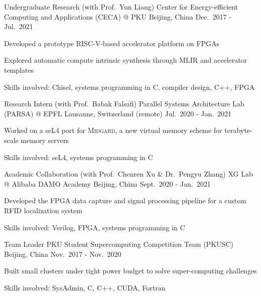 \begin{cventries}
  \cventry
    {Undergraduate Research (with Prof.\ Yun Liang)} %
    {Center for Energy-efficient Computing and Applications (CECA) @ PKU} %
    {Beijing, China} %
    {Dec.\ 2017 - Jul.\ 2021} %
    {
        \begin{cvitems}
            \item {Developed a prototype RISC-V-based accelerator platform on
                FPGAs}
            \item {Explored automatic compute intrinsic synthesis through MLIR
                and accelerator templates}
            \item {Skills involved: Chisel, systems programming in C, compiler
                design, C++, FPGA}
        \end{cvitems}
    }

  \cventry
    {Research Intern (with Prof.\ Babak Falsafi)} %
    {Parallel Systems Architecture Lab (PARSA) @ EPFL} %
    {Lausanne, Switzerland (remote)} %
    {Jul.\ 2020 - Jan.\ 2021} %
    {
        \begin{cvitems}
            \item {Worked on a seL4 port for \textsc{Midgard}, a new virtual
                memory scheme for terabyte-scale memory servers}
            \item {Skills involved: seL4, systems programming in C}
        \end{cvitems}
    }

  \cventry
    {Academic Collaboration (with Prof.\ Chenren Xu \& Dr.\ Pengyu Zhang)} %
    {XG Lab @ Alibaba DAMO Academy} %
    {Beijing, China} %
    {Sept.\ 2020 - Jan.\ 2021} %
    {
        \begin{cvitems}
            \item {Developed the FPGA data capture and signal processing
                pipeline for a custom RFID localization system}
            \item {Skills involved: Verilog, FPGA, systems programming in C}
        \end{cvitems}
    }

  \cventry
    {Team Leader} %
    {PKU Student Supercomputing Competition Team (PKUSC)} %
    {Beijing, China} %
    {Nov.\ 2017 - Nov.\ 2020} %
    {
        \begin{cvitems}
            \item {Built small clusters under tight power budget to solve
                super-computing challenges}
            \item {Skills involved: SysAdmin, C, C++, CUDA, Fortran}
        \end{cvitems}
    }

\end{cventries}

